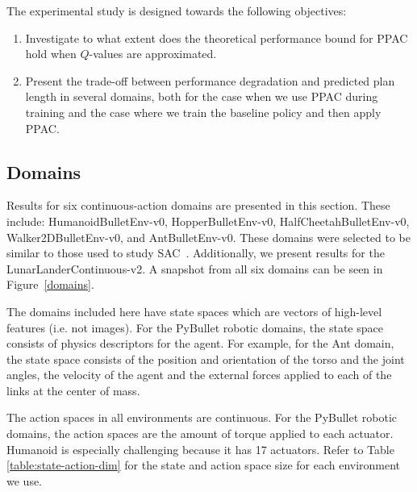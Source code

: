 \documentclass{article}
\begin{document}
        The experimental study is designed towards the following objectives:
        \begin{enumerate}
            \item Investigate to what extent does the theoretical performance bound for PPAC hold when $Q$-values are approximated.
            
            \item Present the trade-off between performance degradation and predicted plan length in several domains, both for the case when we use PPAC during training and the case where we train the baseline policy and then apply PPAC. 
        \end{enumerate}



        \subsection{Domains}
            Results for six continuous-action domains are presented in this section. These include: HumanoidBulletEnv-v0, HopperBulletEnv-v0, HalfCheetahBulletEnv-v0, Walker2DBulletEnv-v0, and AntBulletEnv-v0. 
            These domains were selected to be similar to those used to study SAC~\cite{haarnoja2018soft}. 
            Additionally, we present results for the LunarLanderContinuous-v2. %
            A snapshot from all six domains can be seen in Figure~\ref{domains}.



            The domains included here have state spaces which are vectors of high-level features (i.e. not images). For the PyBullet robotic domains, the state space consists of physics descriptors for the agent. For example, for the Ant domain, the state space consists of the position and orientation of the torso and the joint angles, the velocity of the agent and the external forces applied to each of the links at the center of mass.

            The action spaces in all environments are continuous. For the PyBullet robotic domains, the action spaces are the amount of torque applied to each actuator. Humanoid is especially challenging because it has 17 actuators. Refer to Table \ref{table:state-action-dim} for the state and action space size for each environment we use.
\end{document}
